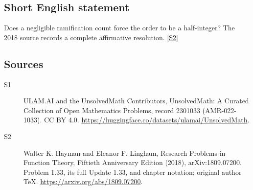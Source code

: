\documentclass[11pt]{article}
\newcommand{\sref}[2]{\hyperlink{source:#1:#2}{[S#2]}}
\begin{document}
\subsection{Short English statement}
Does a negligible ramification count force the order to be a half-integer? The 2018 source records a complete affirmative resolution. \sref{2301033}{2}
\subsection{Sources}
\begin{description}
\item[\hypertarget{source:2301033:1}{S1}] ULAM.AI and the UnsolvedMath Contributors, UnsolvedMath: A Curated Collection of Open Mathematics Problems, record 2301033 (AMR-022-1033). CC BY 4.0. \url{https://huggingface.co/datasets/ulamai/UnsolvedMath}.
\item[\hypertarget{source:2301033:2}{S2}] Walter K. Hayman and Eleanor F. Lingham, Research Problems in Function Theory, Fiftieth Anniversary Edition (2018), arXiv:1809.07200. Problem 1.33, its full Update 1.33, and chapter notation; original author TeX. \url{https://arxiv.org/abs/1809.07200}.
\end{description}
\label{end:2301033}
\end{document}
